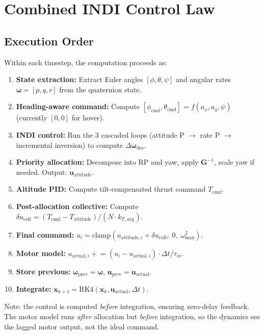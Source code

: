 \documentclass[12pt, a4paper]{article}
\newcommand{\bx}{\bm{x}}
\newcommand{\bu}{\bm{u}}
\newcommand{\bomega}{\bm{\omega}}
\begin{document}
\section{Combined INDI Control Law}
\label{sec:combined}

\subsection{Execution Order}

Within each timestep, the computation proceeds as:
\begin{enumerate}
    \item \textbf{State extraction:} Extract Euler angles $[\phi, \theta, \psi]$ and angular rates $\bomega = [p, q, r]$ from the quaternion state.
    \item \textbf{Heading-aware command:} Compute $[\phi_{\text{cmd}}, \theta_{\text{cmd}}] = f(a_x, a_y, \psi)$ (currently $[0, 0]$ for hover).
    \item \textbf{INDI control:} Run the 3 cascaded loops (attitude P $\to$ rate P $\to$ incremental inversion) to compute $\Delta\dot{\bomega}_{\text{des}}$.
    \item \textbf{Priority allocation:} Decompose into RP and yaw, apply $\bm{G}^{-1}$, scale yaw if needed.  Output: $\bu_{\text{attitude}}$.
    \item \textbf{Altitude PID:} Compute tilt-compensated thrust command $T_{\text{cmd}}$.
    \item \textbf{Post-allocation collective:} Compute $\delta u_{\text{coll}} = (T_{\text{cmd}} - T_{\text{attitude}})/(N \cdot k_{T,\text{avg}})$.
    \item \textbf{Final command:} $u_i = \text{clamp}(u_{\text{attitude},i} + \delta u_{\text{coll}}, \; 0, \; \omega_{\max}^2)$.
    \item \textbf{Motor model:} $u_{\text{actual},i} \mathrel{+}= (u_i - u_{\text{actual},i}) \cdot \Delta t / \tau_m$.
    \item \textbf{Store previous:} $\bomega_{\text{prev}} = \bomega$, $\bu_{\text{prev}} = \bu_{\text{actual}}$.
    \item \textbf{Integrate:} $\bx_{k+1} = \text{RK4}(\bx_k, \bu_{\text{actual}}, \Delta t)$.
\end{enumerate}

Note: the control is computed \emph{before} integration, ensuring zero-delay feedback.  The motor model runs \emph{after} allocation but \emph{before} integration, so the dynamics see the lagged motor output, not the ideal command.
\end{document}
